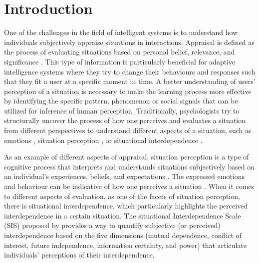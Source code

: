 \section{Introduction} \label{intro}
One of the challenges in the field of intelligent systems is to understand how individuals subjectively appraise situations in interactions. Appraisal is defined as the process of evaluating situations based on personal belief, relevance, and significance \cite{scherer2005emotions}. This type of information is particularly beneficial for adaptive intelligence systems where they try to change their behaviours and responses such that they fit a user at a specific moment in time. A better understanding of users' perception of a situation is necessary to make the learning process more effective by identifying the specific pattern, phenomenon or social signals that can be utilized for inference of human perception. Traditionally, psychologists try to structurally uncover the process of how one perceives and evaluates a situation from different perspectives to understand different aspects of a situation, such as emotions \cite{scherer2005emotions, scherer2013nature}, situation perception \cite{rauthmann2014situational}, or situational interdependence \cite{gerpott2017howdopeople}.


As an example of different aspects of appraisal, situation perception is a type of cognitive process that interprets and understands situations subjectively based on an individual's experiences, beliefs, and expectations \cite{tekoppele2023we}. The expressed emotions and behaviour can be indicative of how one perceives a situation \cite{hess2020bidirectional, horstmann2019situational}. When it comes to different aspects of evaluation, as one of the facets of situation perception, there is situational interdependence, which particularly highlights the perceived interdependence in a certain situation. The situational Interdependence Scale (SIS) proposed by \citeauthor{gerpott2017howdopeople} \cite{gerpott2017howdopeople} provides a way to quantify subjective (or perceived) interdependence based on the five dimensions (mutual dependence, conflict of interest, future independence, information certainty, and power) that articulate individuals' perceptions of their interdependence. 

